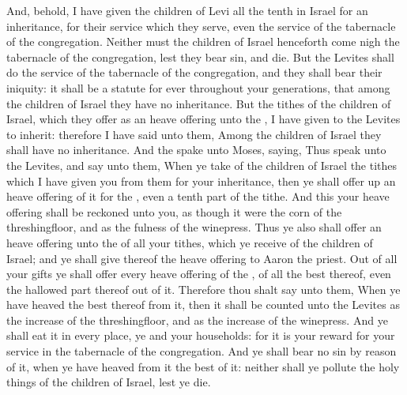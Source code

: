 \begin{biblechapter}
\verse And, behold, I have given the children of Levi all the tenth in Israel for an inheritance, for their service which they serve, even the service of the tabernacle of the congregation.
\verse Neither must the children of Israel henceforth come nigh the tabernacle of the congregation, lest they bear sin, and die.
\verse But the Levites shall do the service of the tabernacle of the congregation, and they shall bear their iniquity: it shall be a statute for ever throughout your generations, that among the children of Israel they have no inheritance.
\verse But the tithes of the children of Israel, which they offer as an heave offering unto the \LORD, I have given to the Levites to inherit: therefore I have said unto them, Among the children of Israel they shall have no inheritance.
\verse And the \LORD spake unto Moses, saying,
\verse Thus speak unto the Levites, and say unto them, When ye take of the children of Israel the tithes which I have given you from them for your inheritance, then ye shall offer up an heave offering of it for the \LORD, even a tenth part of the tithe.
\verse And this your heave offering shall be reckoned unto you, as though it were the corn of the threshingfloor, and as the fulness of the winepress.
\verse Thus ye also shall offer an heave offering unto the \LORD of all your tithes, which ye receive of the children of Israel; and ye shall give thereof the \LORDs heave offering to Aaron the priest.
\verse Out of all your gifts ye shall offer every heave offering of the \LORD, of all the best thereof, even the hallowed part thereof out of it.
\verse Therefore thou shalt say unto them, When ye have heaved the best thereof from it, then it shall be counted unto the Levites as the increase of the threshingfloor, and as the increase of the winepress.
\verse And ye shall eat it in every place, ye and your households: for it is your reward for your service in the tabernacle of the congregation.
\verse And ye shall bear no sin by reason of it, when ye have heaved from it the best of it: neither shall ye pollute the holy things of the children of Israel, lest ye die.
\end{biblechapter}

